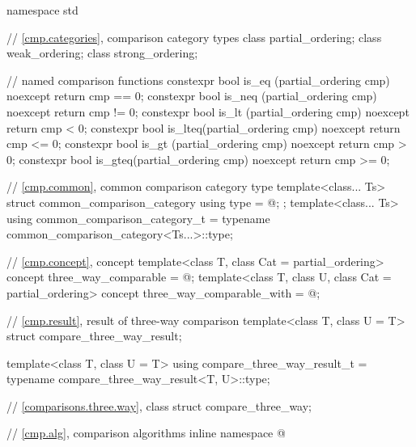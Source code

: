 %
%
%
%
%
%
%
%
\begin{codeblock}
namespace std {
  // \ref{cmp.categories}, comparison category types
  class partial_ordering;
  class weak_ordering;
  class strong_ordering;

  // named comparison functions
  constexpr bool is_eq  (partial_ordering cmp) noexcept { return cmp == 0; }
  constexpr bool is_neq (partial_ordering cmp) noexcept { return cmp != 0; }
  constexpr bool is_lt  (partial_ordering cmp) noexcept { return cmp < 0; }
  constexpr bool is_lteq(partial_ordering cmp) noexcept { return cmp <= 0; }
  constexpr bool is_gt  (partial_ordering cmp) noexcept { return cmp > 0; }
  constexpr bool is_gteq(partial_ordering cmp) noexcept { return cmp >= 0; }

  // \ref{cmp.common}, common comparison category type
  template<class... Ts>
  struct common_comparison_category {
    using type = @\seebelow@;
  };
  template<class... Ts>
    using common_comparison_category_t = typename common_comparison_category<Ts...>::type;

  // \ref{cmp.concept}, concept 
  template<class T, class Cat = partial_ordering>
    concept three_way_comparable = @\seebelow@;
  template<class T, class U, class Cat = partial_ordering>
    concept three_way_comparable_with = @\seebelow@;

  // \ref{cmp.result}, result of three-way comparison
  template<class T, class U = T> struct compare_three_way_result;

  template<class T, class U = T>
    using compare_three_way_result_t = typename compare_three_way_result<T, U>::type;

  // \ref{comparisons.three.way}, class 
  struct compare_three_way;

  // \ref{cmp.alg}, comparison algorithms
  inline namespace @
}
\end{codeblock}

